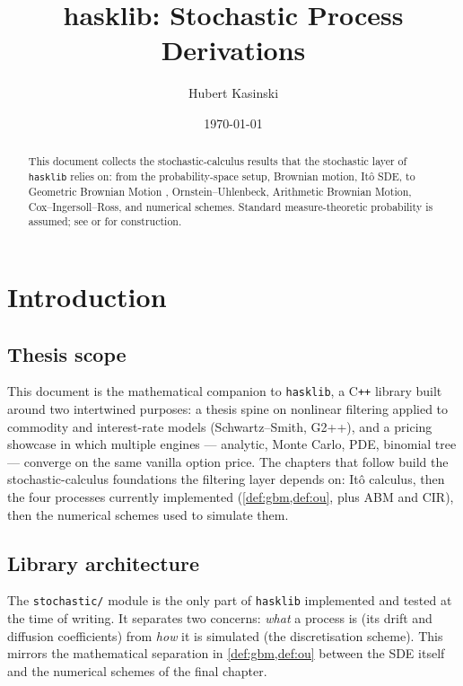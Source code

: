 \documentclass[11pt]{report}
\title{hasklib: Stochastic Process Derivations}
\author{Hubert Kasinski}
\date{\today}
\theoremstyle{plain}
\theoremstyle{definition}
\theoremstyle{remark}
\numberwithin{equation}{chapter}
\begin{document}
\maketitle

\begin{abstract}
This document collects the stochastic-calculus results that the
stochastic layer of \texttt{hasklib} relies on: from the
probability-space setup, Brownian motion, It\^o SDE, to Geometric Brownian Motion
, Ornstein--Uhlenbeck, Arithmetic Brownian Motion, Cox--Ingersoll--Ross, and numerical schemes.
Standard measure-theoretic probability is assumed; see
 or  for construction.
\end{abstract}

\tableofcontents

\chapter*{Introduction}

\section*{Thesis scope}

This document is the mathematical companion to \texttt{hasklib}, a
C\texttt{++} library built around two intertwined purposes: a thesis
spine on nonlinear filtering applied to commodity and interest-rate
models (Schwartz--Smith, G2++), and a pricing showcase in which
multiple engines --- analytic, Monte Carlo, PDE, binomial tree ---
converge on the same vanilla option price. The chapters that follow
build the stochastic-calculus foundations the filtering layer depends
on: It\^o calculus, then the four processes currently implemented
(\cref{def:gbm,def:ou}, plus ABM and CIR), then the numerical schemes
used to simulate them.

\section*{Library architecture}

The \texttt{stochastic/} module is the only part of \texttt{hasklib}
implemented and tested at the time of writing. It separates two
concerns: \emph{what} a process is (its drift and diffusion
coefficients) from \emph{how} it is simulated (the discretisation
scheme). This mirrors the mathematical separation in
\cref{def:gbm,def:ou} between the SDE itself and the numerical schemes
of the final chapter.
\end{document}

